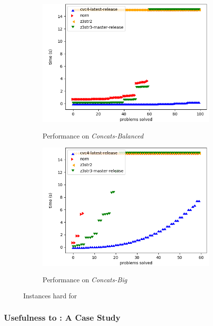 \begin{figure}[h]
\begin{subfigure}{.5\textwidth}
        \includegraphics[width=\textwidth]{data/graphs/concats-balanced.png}
        \label{fig:concats-balanced}
        \caption{Performance on \textit{Concats-Balanced}}
    \end{subfigure}
    \begin{subfigure}{.5\textwidth}
        \includegraphics[width=\textwidth]{data/graphs/concats-big.png}
        \label{fig:concats-big}
        \caption{Performance on \textit{Concats-Big}}
    \end{subfigure}
    \caption{Instances hard for \us{}}
    \label{fig:z3str3-hard}
\end{figure}

\subsubsection{Usefulness to \us{}: A Case Study}

